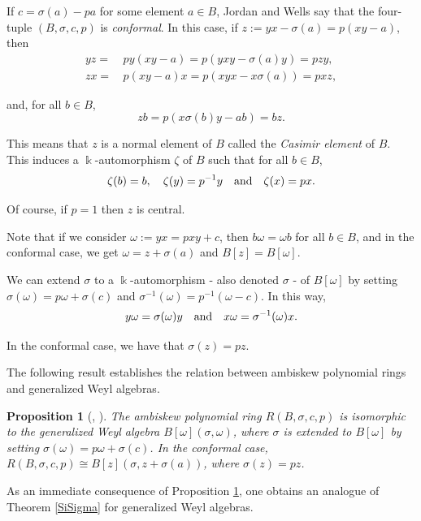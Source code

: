 \documentclass{amsart}
\newtheorem{proposition}[theorem]{Proposition}
\theoremstyle{definition}
\theoremstyle{remark}
\numberwithin{equation}{section}
\begin{document}
If $c = \sigma(a) - pa$ for some element $a\in B$, Jordan and Wells \cite{JordanWells1996} say that the four-tuple $(B, \sigma, c, p)$ is {\em conformal}. In this case, if $z := yx - \sigma(a) = p(xy - a)$, then 
\begin{align}
    yz = &\, py(xy - a) = p(yxy - \sigma(a)y) = pzy, \label{Jordan2000(4a)} \\
    zx = &\, p(xy - a)x = p(xyx - x\sigma(a)) = pxz, \label{Jordan2000(4b)} 
\end{align}

and, for all $b\in B$, 
\begin{equation}\label{Jordan2000(4c)} 
zb = p (x\sigma(b) y - ab) = bz.
\end{equation}

This means that $z$ is a normal element of $B$ called the {\em Casimir element} of $B$. This induces a $\Bbbk$-automorphism $\zeta$ of $B$ such that for all $b\in B$, 
$$
\zeta(b) = b, \quad \zeta(y) = p^{-1}y \quad {\rm and} \quad \zeta(x) = px.
$$

Of course, if $p = 1$ then $z$ is central.

Note that if we consider $\omega := yx = pxy + c$, then $b\omega = \omega b$ for all $b\in B$, and in the conformal case, we get $\omega = z + \sigma(a)$ and $B[z] = B[\omega]$.

We can extend $\sigma$ to a $\Bbbk$-automorphism - also denoted $\sigma$ - of $B[\omega]$ by setting $\sigma(\omega) = p\omega + \sigma(c)$ and $\sigma^{-1}(\omega) = p^{-1}(\omega - c)$. In this way, 
$$
y\omega = \sigma(\omega) y \quad {\rm and} \quad x\omega = \sigma^{-1}(\omega) x.
$$

In the conformal case, we have that $\sigma(z) = pz$.

The following result establishes the relation between ambiskew polynomial rings and generalized Weyl algebras.

\begin{proposition}[{\cite[Lemma 1.2]{Bavula1996}, \cite[Corollary 2.6]{JordanWells1996}}]\label{Jordan2000Proposition2.1}
The ambiskew polynomial ring $R(B, \sigma, c, p)$ is isomorphic to the generalized Weyl algebra $B[\omega](\sigma, \omega)$, where $\sigma$ is extended to $B[\omega]$ by setting $\sigma(\omega) = p\omega + \sigma(c)$. In the conformal case, $R(B, \sigma, c, p) \cong B[z](\sigma, z + \sigma(a))$, where $\sigma(z) = pz$.
\end{proposition}

As an immediate consequence of Proposition \ref{Jordan2000Proposition2.1}, one obtains an analogue of Theorem \ref{SiSigma} for generalized Weyl algebras.
\end{document}
